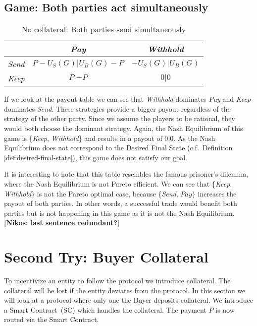 \documentclass{cacthesis}
\newcommand{\authnote}[3]{{ \footnotesize \textbf{#1[#2: #3]~}}}
\newcommand{\orfnote}[1]{\authnote{\color{blue}}{Orfeas}{#1}}
\newcommand{\niknote}[1]{\authnote{\color{red}}{Nikos}{#1}}
\begin{document}
\subsection{Game: Both parties act simultaneously} 

\begin{table}[htb!]
    \centering
    \begin{tabular}{ c||c|c| }
    & \emph{Pay} & \emph{Withhold}  \\
    \hline
    \hline
    \emph{Send} & $P - U_S(G)|U_B(G) - P$ & $-U_S(G) | U_B(G)$ \\
    \hline
    \emph{Keep} & $P |-P$ & $0 | 0$ \\ 
    \hline
    \end{tabular}
    \label{fig:nocol-simultaneous}
    \caption{No collateral: Both parties send simultaneously}
\end{table}
If we look at the payout table we can see that \emph{Withhold} dominates \emph{Pay} and \emph{Keep} dominates \emph{Send}. These strategies provide a bigger payout regardless of the strategy of the other party.
Since we assume the players to be rational, they would both choose the dominant strategy.
Again, the Nash Equilibrium of this game is \{\emph{Keep}, \emph{Withhold}\} and results in a payout of $0|0$. As the Nash Equilibrium does not correspond to the Desired Final State (c.f.~Definition \ref{def:desired-final-state}), this game does not satisfy our goal.\newline

It is interesting to note that this table resembles the famous prisoner's dilemma, where the Nash Equilibrium is not Pareto efficient. We can see that \{\emph{Keep}, \emph{Withhold}\} is not the Pareto optimal case, because \{\emph{Send}, $Pay\}$ increases the payout of both parties. 
In other words, a successful trade would benefit both parties but is not happening in this game as it is not the Nash Equilibrium. \niknote{last sentence redundant?}



\section{Second Try: Buyer Collateral}
\label{sec:Buyer-collateral}
To incentivize an entity to follow the protocol we introduce collateral. The collateral will be lost if the entity deviates from the protocol. In this section we will look at a protocol where only one the Buyer deposits collateral. We introduce a Smart Contract~(SC) which handles the collateral. The payment $P$ is now routed via the Smart Contract.  \newline
\end{document}
